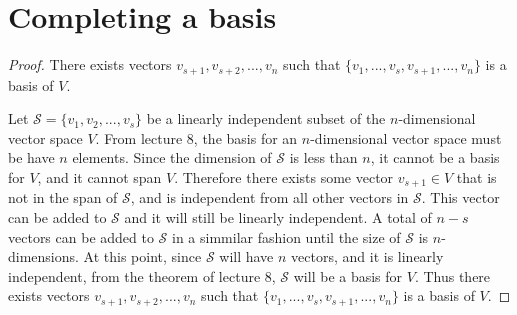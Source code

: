 \section{Completing a basis}
\begin{proof}There exists vectors $v_{s+1},v_{s+2},...,v_n$ such that 
            $\{v_1,...,v_s,v_{s+1},...,v_n\}$ is a basis of $V$.\gap

    Let $\mathcal{S}=\{v_1,v_2,...,v_s\}$ be a 
    linearly independent subset of the $n$-dimensional vector space $V$.
    From lecture 8, the basis for an $n$-dimensional vector space must be have $n$ elements.
    Since the dimension of $\mathcal{S}$ is less than $n$, 
    it cannot be a basis for $V$, and it cannot span $V$.
    Therefore there exists some vector $v_{s+1} \in V$ that is not in the span of 
    $\mathcal{S}$, and is independent from all other vectors in $\mathcal{S}$.
    This vector can be added to $\mathcal{S}$ and it will still be linearly independent.
    A total of $n-s$ vectors can be added to $\mathcal{S}$ in a simmilar fashion
    until the size of $\mathcal{S}$ is $n$-dimensions.
    At this point, since $\mathcal{S}$ will have $n$ vectors,
    and it is linearly independent,
    from the theorem of lecture 8, $\mathcal{S}$ will be a basis for $V$.
    Thus there exists vectors $v_{s+1},v_{s+2},...,v_n$ such that
    $\{v_1,...,v_s,v_{s+1},...,v_n\}$ is a basis of $V$.
\end{proof}
